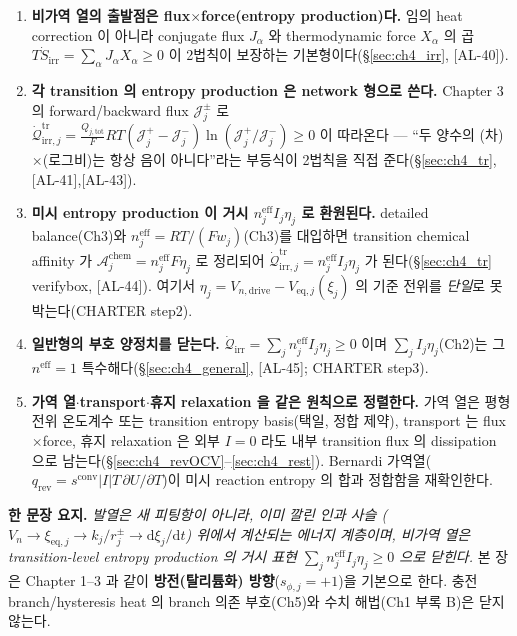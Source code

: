 \documentclass[11pt,a4paper]{article}
\newcommand{\dd}{\mathrm{d}}
\newcommand{\eff}{\mathrm{eff}}
\newcommand{\eq}{\mathrm{eq}}
\newcommand{\drive}{\mathrm{drive}}
\newcommand{\tot}{\mathrm{tot}}
\newcommand{\irr}{\mathrm{irr}}
\newcommand{\rev}{\mathrm{rev}}
\newcommand{\conv}{\mathrm{conv}}
\newcommand{\tr}{\mathrm{tr}}
\newcommand{\chem}{\mathrm{chem}}
\newcommand{\AL}[1]{\textsf{[AL-#1]}}
\begin{document}
\begin{enumerate}[label=\textbf{(\arabic*)},leftmargin=2.2em]
\item \textbf{비가역 열의 출발점은 flux$\times$force(entropy production)다.} 임의 heat correction 이 아니라
  conjugate flux $J_\alpha$ 와 thermodynamic force $X_\alpha$ 의 곱 $T\dot S_\irr=\sum_\alpha J_\alpha X_\alpha\ge0$
  이 2법칙이 보장하는 기본형이다(\S\ref{sec:ch4_irr}, \AL{40}).
\item \textbf{각 transition 의 entropy production 은 network 형으로 쓴다.} Chapter 3 의 forward/backward
  flux $\mathcal J_j^\pm$ 로 $\dot{\mathcal Q}_{\irr,j}^{\tr}=\tfrac{Q_{j,\tot}}{F}RT(\mathcal J_j^+-\mathcal J_j^-)
  \ln(\mathcal J_j^+/\mathcal J_j^-)\ge0$ 이 따라온다 — ``두 양수의 (차)$\times$(로그비)는 항상 음이 아니다''라는
  부등식이 2법칙을 직접 준다(\S\ref{sec:ch4_tr}, \AL{41},\AL{43}).
\item \textbf{미시 entropy production 이 거시 $n_j^{\eff}I_j\eta_j$ 로 환원된다.} detailed balance(Ch3)와
  $n_j^{\eff}=RT/(Fw_j)$(Ch3)를 대입하면 transition chemical affinity 가 $\mathcal A_j^{\chem}=n_j^{\eff}F\eta_j$
  로 정리되어 $\dot{\mathcal Q}_{\irr,j}^{\tr}=n_j^{\eff}I_j\eta_j$ 가 된다(\S\ref{sec:ch4_tr} verifybox,
  \AL{44}). 여기서 $\eta_j=V_{n,\drive}-V_{\eq,j}(\xi_j)$ 의 기준 전위를 \emph{단일}로 못박는다(CHARTER step2).
\item \textbf{일반형의 부호 양정치를 닫는다.} $\dot{\mathcal Q}_\irr=\sum_j n_j^{\eff}I_j\eta_j\ge0$ 이며
  $\sum_j I_j\eta_j$(Ch2)는 그 $n^{\eff}=1$ 특수해다(\S\ref{sec:ch4_general}, \AL{45}; CHARTER step3).
\item \textbf{가역 열$\cdot$transport$\cdot$휴지 relaxation 을 같은 원칙으로 정렬한다.} 가역 열은 평형 전위
  온도계수 또는 transition entropy basis(택일, 정합 제약), transport 는 flux$\times$force, 휴지 relaxation 은
  외부 $I=0$ 라도 내부 transition flux 의 dissipation 으로 남는다(\S\ref{sec:ch4_revOCV}--\ref{sec:ch4_rest}).
  Bernardi 가역열($q_\rev=s^\conv|I|T\,\partial U/\partial T$)이 미시 reaction entropy 의 합과 정합함을
  재확인한다.
\end{enumerate}

\noindent\textbf{한 문장 요지.} \emph{발열은 새 피팅항이 아니라, 이미 깔린 인과 사슬
($V_n\to\xi_{\eq,j}\to k_j/r_j^\pm\to\dd\xi_j/\dd t$) 위에서 계산되는 에너지 계층이며, 비가역 열은
transition-level entropy production 의 거시 표현 $\sum_j n_j^{\eff}I_j\eta_j\ge0$ 으로 닫힌다.} 본 장은
Chapter 1--3 과 같이 \textbf{방전(탈리튬화) 방향}($s_{\phi,j}=+1$)을 기본으로 한다. 충전 branch/hysteresis
heat 의 branch 의존 부호(Ch5)와 수치 해법(Ch1 부록 B)은 닫지 않는다.
\end{document}
